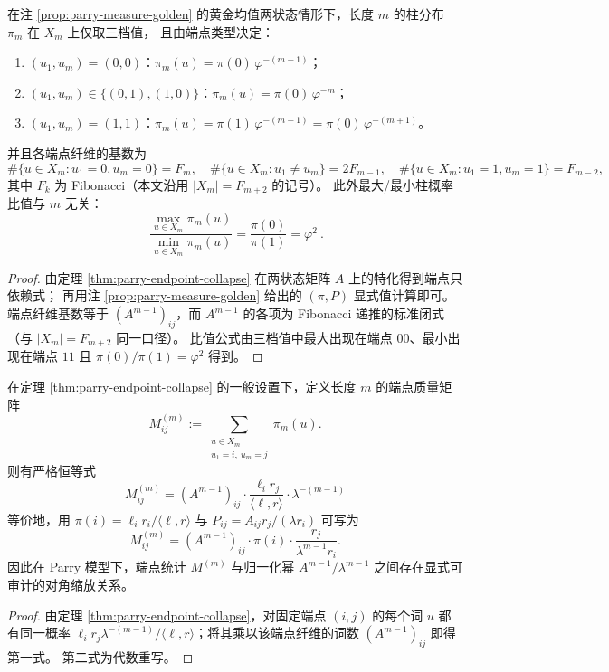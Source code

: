 \begin{corollary}\label{cor:parry-golden-three-levels}
在注 \ref{prop:parry-measure-golden} 的黄金均值两状态情形下，长度 \(m\) 的柱分布 \(\pi_m\) 在 \(X_m\) 上仅取三档值，
且由端点类型决定：
\begin{enumerate}
  \item \((u_1,u_m)=(0,0)\)：\(\pi_m(u)=\pi(0)\,\varphi^{-(m-1)}\)；
  \item \((u_1,u_m)\in\{(0,1),(1,0)\}\)：\(\pi_m(u)=\pi(0)\,\varphi^{-m}\)；
  \item \((u_1,u_m)=(1,1)\)：\(\pi_m(u)=\pi(1)\,\varphi^{-(m-1)}=\pi(0)\,\varphi^{-(m+1)}\)。
\end{enumerate}
并且各端点纤维的基数为
\[
\#\{u\in X_m:u_1=0,u_m=0\}=F_m,\quad
\#\{u\in X_m:u_1\neq u_m\}=2F_{m-1},\quad
\#\{u\in X_m:u_1=1,u_m=1\}=F_{m-2},
\]
其中 \(F_k\) 为 Fibonacci（本文沿用 \(|X_m|=F_{m+2}\) 的记号）。
此外最大/最小柱概率比值与 \(m\) 无关：
\[
\boxed{\ \frac{\max_{u\in X_m}\pi_m(u)}{\min_{u\in X_m}\pi_m(u)}=\frac{\pi(0)}{\pi(1)}=\varphi^2\ }.
\]
\end{corollary}
\begin{proof}
由定理 \ref{thm:parry-endpoint-collapse} 在两状态矩阵 \(A\) 上的特化得到端点只依赖式；
再用注 \ref{prop:parry-measure-golden} 给出的 \((\pi,P)\) 显式值计算即可。
端点纤维基数等于 \((A^{m-1})_{ij}\)，而 \(A^{m-1}\) 的各项为 Fibonacci 递推的标准闭式（与 \(|X_m|=F_{m+2}\) 同一口径）。
比值公式由三档值中最大出现在端点 \(00\)、最小出现在端点 \(11\) 且 \(\pi(0)/\pi(1)=\varphi^2\) 得到。
\end{proof}

\begin{proposition}\label{prop:parry-endpoint-mass-matrix}
在定理 \ref{thm:parry-endpoint-collapse} 的一般设置下，定义长度 \(m\) 的端点质量矩阵
\[
M^{(m)}_{ij}
:=
\sum_{\substack{u\in X_m\\ u_1=i,\ u_m=j}}\pi_m(u).
\]
则有严格恒等式
\[
\boxed{\;
M^{(m)}_{ij}
=
(A^{m-1})_{ij}\cdot \frac{\ell_i r_j}{\langle \ell,r\rangle}\cdot \lambda^{-(m-1)}\;}
\]
等价地，用 \(\pi(i)=\ell_i r_i/\langle \ell,r\rangle\) 与 \(P_{ij}=A_{ij}r_j/(\lambda r_i)\) 可写为
\[
M^{(m)}_{ij}
=(A^{m-1})_{ij}\cdot \pi(i)\cdot \frac{r_j}{\lambda^{m-1}r_i}.
\]
因此在 Parry 模型下，端点统计 \(M^{(m)}\) 与归一化幂 \(A^{m-1}/\lambda^{m-1}\) 之间存在显式可审计的对角缩放关系。
\end{proposition}
\begin{proof}
由定理 \ref{thm:parry-endpoint-collapse}，对固定端点 \((i,j)\) 的每个词 \(u\) 都有同一概率
\(\ell_i r_j\lambda^{-(m-1)}/\langle \ell,r\rangle\)；将其乘以该端点纤维的词数 \((A^{m-1})_{ij}\) 即得第一式。
第二式为代数重写。
\end{proof}

